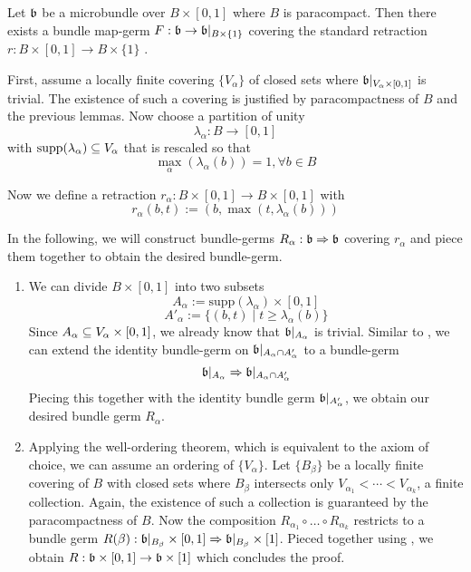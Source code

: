 \begin{file}
\begin{mylemma}\label{homotopy::lemma3}
    Let $\bb$ be a microbundle over $B \times [0, 1]$ where $B$ is paracompact.
    Then there exists a bundle map-germ $F: \bb \to \bb\restr{B \times \{1\}}$
    covering the standard retraction $r: B \times [0, 1] \to B \times \{1\}$ .
\end{mylemma}
\begin{myproof}
    First, assume a locally finite covering $\{V_\alpha\}$ of closed sets where $\bb\restr{V_\alpha \times [0, 1]}$ is trivial.
    The existence of such a covering is justified by paracompactness of $B$ and the previous lemmas.
    Now choose a partition of unity
    \[ \lambda_\alpha: B \to [0, 1] \]
    with $\text{supp}(\lambda_\alpha) \sub V_\alpha$ that is rescaled so that
    \[ \max_{\alpha}(\lambda_\alpha(b)) = 1, \forall b \in B \]
    
    Now we define a retraction $r_\alpha: B \times [0, 1] \to B \times [0, 1]$ with
    \[ r_\alpha(b, t) := (b, \max(t, \lambda_\alpha(b))) \]

    In the following, we will construct bundle-germs $R_\alpha: \bb \double \bb$ covering $r_\alpha$
    and piece them together to obtain the desired bundle-germ.
    \begin{enumerate}
        \item 
        We can divide $B \times [0, 1]$ into two subsets
        \[ A_\alpha := \text{supp}(\lambda_\alpha) \times [0, 1] \]
        \[ A'_\alpha := \{(b, t) \mid t \ge \lambda_\alpha(b)\} \]
        Since $A_\alpha \sub V_\alpha \times [0, 1]$, we already know that $\bb\restr{A_\alpha}$ is trivial.
        Similar to , we can extend the identity bundle-germ on $\bb\restr{\A \cap \A[']}$ to a bundle-germ
        \[ \bb\restr{\A} \double \bb\restr{\A \cap \A[']} \]
        Piecing this together with the identity bundle germ $\bb\restr{\A[']}$, we obtain our desired bundle germ $R_\alpha$.
        
        \item
        Applying the well-ordering theorem, which is equivalent to the axiom of choice, we can assume an ordering of $\{ V_\alpha \}$.
        Let $\{B_\beta\}$ be a locally finite covering of $B$ with closed sets where $B_\beta$ intersects only $V_{\alpha_1} < \cdots < V_{\alpha_k}$, a finite collection.
        Again, the existence of such a collection is guaranteed by the paracompactness of $B$. 
        Now the composition $R_{\alpha_1} \circ \ldots \circ R_{\alpha_k}$ restricts to a bundle germ $R(\beta): \bb\restr{B_\beta} \times [0, 1] \double \bb\restr{B_\beta} \times [1]$.
        Pieced together using , we obtain $R: \bb \times [0, 1]\to \bb \times [1]$ which concludes the proof.
    \end{enumerate}    
\end{myproof}


\end{file}
